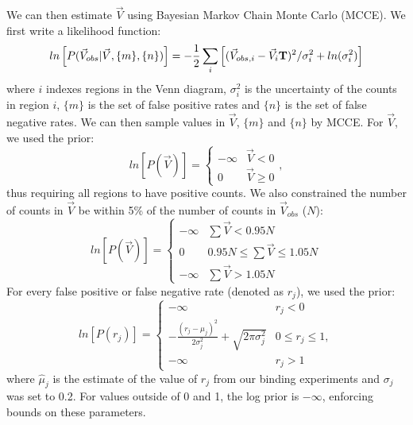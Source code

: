 We can then estimate $\vec{V}$ using Bayesian Markov Chain Monte
Carlo (MCCE). We first write a likelihood function: 
\[
ln\left[P(\vec{V}_{obs}|\vec{V},\{m\},\{n\})\right]=-\frac{1}{2}\sum_{i}\left[(\vec{V}_{obs,i}-\vec{V}_{i}{\bf T})^{2}/\sigma_{i}^{2}+ln(\sigma_{i}^{2})\right]
\]
where $i$ indexes regions in the Venn diagram, $\sigma_{i}^{2}$
is the uncertainty of the counts in region $i$, $\{m\}$ is the set
of false positive rates and $\{n\}$ is the set of false negative
rates. We can then sample values in $\vec{V}$, $\{m\}$ and $\{n\}$
by MCCE. For $\vec{V}$, we used the prior:
\[
ln\left[P(\vec{V})\right]=\begin{cases}
-\infty & \vec{V}<0\\
0 & \vec{V}\ge0
\end{cases},
\]
thus requiring all regions to have positive counts. We also constrained
the number of counts in $\vec{V}$ be within 5\% of the number of
counts in $\vec{V}_{obs}$ ($N$): 
\[
ln[P(\vec{V})]=\begin{cases}
-\infty & \sum\vec{V}<0.95N\\
0 & 0.95N\le\sum\vec{V}\le1.05N\\
-\infty & \sum\vec{V}>1.05N
\end{cases}
\]
For every false positive or false negative rate (denoted as $r_{j}$),
we used the prior:
\[
ln\left[P(r_{j})\right]=\begin{cases}
-\infty & r_{j}<0\\
-\frac{(r_{j}-\hat{\mu}_{j})^{2}}{2\sigma_{j}^{2}}+\sqrt{2\pi\sigma_{j}^{2}} & 0\le r_{j}\le1,\\
-\infty & r_{j}>1
\end{cases}
\]
where $\hat{\mu}_{j}$ is the estimate of the value of $r_{j}$ from
our binding experiments and $\sigma_{j}$ was set to 0.2. For values
outside of 0 and 1, the log prior is $-\infty$, enforcing bounds
on these parameters. 


